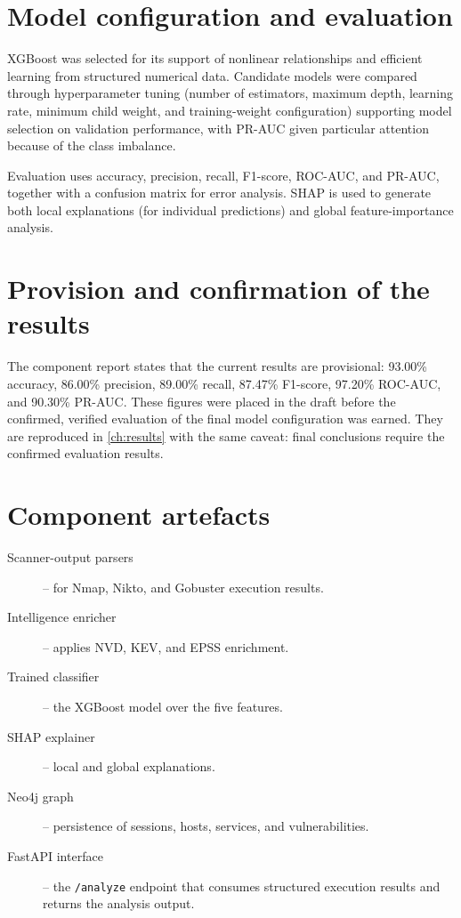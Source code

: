\section{Model configuration and evaluation}

XGBoost was selected for its support of nonlinear relationships and efficient
learning from structured numerical data. Candidate models were compared through
hyperparameter tuning (number of estimators, maximum depth, learning rate,
minimum child weight, and training-weight configuration) supporting model
selection on validation performance, with PR-AUC given particular attention
because of the class imbalance.

Evaluation uses accuracy, precision, recall, F1-score, ROC-AUC, and PR-AUC,
together with a confusion matrix for error analysis. SHAP is used to generate
both local explanations (for individual predictions) and global feature-importance
analysis.

\section{Provision and confirmation of the results}

The component report states that the current results are provisional:
93.00\% accuracy, 86.00\% precision, 89.00\% recall, 87.47\% F1-score, 97.20\%
ROC-AUC, and 90.30\% PR-AUC. These figures were placed in the draft before the
confirmed, verified evaluation of the final model configuration was earned.
They are reproduced in \cref{ch:results} with the same caveat: final
conclusions require the confirmed evaluation results.

\section{Component artefacts}

\begin{description}
  \item[Scanner-output parsers] -- for Nmap, Nikto, and Gobuster execution
  results.
  \item[Intelligence enricher] -- applies NVD, KEV, and EPSS enrichment.
  \item[Trained classifier] -- the XGBoost model over the five features.
  \item[SHAP explainer] -- local and global explanations.
  \item[Neo4j graph] -- persistence of sessions, hosts, services, and
  vulnerabilities.
  \item[FastAPI interface] -- the \texttt{/analyze} endpoint that consumes
  structured execution results and returns the analysis output.
\end{description}